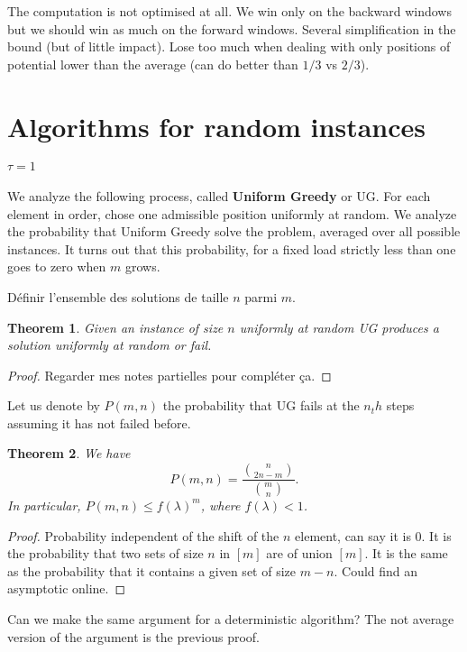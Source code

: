 \documentclass[10pt, conference, letterpaper]{IEEEtran}
\newtheorem{theorem}{Theorem}
\begin{document}
The computation is not optimised at all. We win only on the backward windows but 
we should win as much on the forward windows. Several simplification in the bound (but of little impact).
Lose too much when dealing with only positions of potential lower than the average (can do better than $1/3 $ vs $2/3$).

\section{Algorithms for random instances}

\paragraph{$\tau = 1$}

We analyze the following process, called \textbf{Uniform Greedy} or UG.
For each element in order, chose one admissible position
uniformly at random. We analyze the probability that Uniform Greedy
solve the problem, averaged over all possible instances. 
It turns out that this probability, for a fixed load strictly less than
one goes to zero when $m$ grows. 

Définir l'ensemble des solutions de taille $n$ parmi $m$.
\begin{theorem}
Given an instance of size $n$ uniformly at random UG
produces a solution uniformly at random or fail.
\end{theorem}
\begin{proof}
Regarder mes notes partielles pour compléter ça.
\end{proof}

Let us denote by $P(m,n)$ the probability that UG fails at the $n_th$
steps assuming it has not failed before.

\begin{theorem}
We have $$P(m,n) = \frac{\binom{n}{2n-m}}{\binom{m}{n}}.$$
In particular, $P(m,n) \leq f(\lambda)^m$, where $f(\lambda) < 1$.
\end{theorem}
\begin{proof}
Probability independent of the shift of the $n$ element, can say it is $0$.
It is the probability that two sets of size $n$ in $[m]$ are of union $[m]$.
It is the same as the probability that it contains a given set of size $m-n$.
Could find an asymptotic online.
\end{proof}

Can we make the same argument for a deterministic algorithm?
The not average version of the argument is the previous proof.
\end{document}
